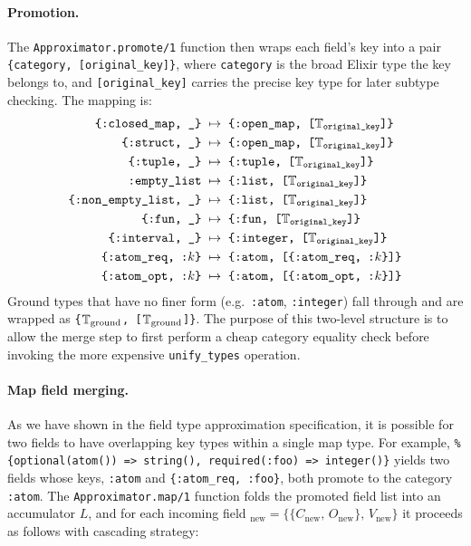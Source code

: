 \paragraph{Promotion.}
The \texttt{Approximator.promote/1} function then wraps each field's key into a pair \texttt{\{category, [original\_key]\}}, where \texttt{category} is the broad Elixir type the key belongs to, and \texttt{[original\_key]} carries the precise key type for later subtype checking.
The mapping is:
\begin{align*}
  \texttt{\{:closed\_map, \_\}} &\;\mapsto\; \texttt{\{:open\_map,  [$\mathbb{T}_{\text{original\_key}}$]\}} \\
  \texttt{\{:struct, \_\}}      &\;\mapsto\; \texttt{\{:open\_map,  [$\mathbb{T}_{\text{original\_key}}$]\}} \\
  \texttt{\{:tuple, \_\}}       &\;\mapsto\; \texttt{\{:tuple,     [$\mathbb{T}_{\text{original\_key}}$]\}} \\
  \texttt{:empty\_list}         &\;\mapsto\; \texttt{\{:list,      [$\mathbb{T}_{\text{original\_key}}$]\}} \\
  \texttt{\{:non\_empty\_list, \_\}} &\;\mapsto\; \texttt{\{:list, [$\mathbb{T}_{\text{original\_key}}$]\}} \\
  \texttt{\{:fun, \_\}}         &\;\mapsto\; \texttt{\{:fun,   [$\mathbb{T}_{\text{original\_key}}$]\}} \\      
  \texttt{\{:interval, \_\}}    &\;\mapsto\; \texttt{\{:integer,   [$\mathbb{T}_{\text{original\_key}}$]\}} \\
  \texttt{\{:atom\_req, :$k$\}}    &\;\mapsto\; \texttt{\{:atom,      [\{:atom\_req, :$k$\}]\}} \\
  \texttt{\{:atom\_opt, :$k$\}}    &\;\mapsto\; \texttt{\{:atom,      [\{:atom\_opt, :$k$\}]\}}
\end{align*}
Ground types that have no finer form (e.g.\ \texttt{:atom}, \texttt{:integer}) fall through and are wrapped as \texttt{\{$\mathbb{T}_{\text{ground}}$, [$\mathbb{T}_{\text{ground}}$]\}}.
The purpose of this two-level structure is to allow the merge step to first perform a cheap category equality check before invoking the more expensive \texttt{unify\_types} operation.

\paragraph{Map field merging.}
As we have shown in the field type approximation specification, it is possible for two fields to have overlapping key types within a single map type.
For example, \texttt{\%\{optional(atom()) => string(), required(:foo) => integer()\}} yields two fields whose keys, \texttt{:atom} and \texttt{\{:atom\_req, :foo\}}, both promote to the category \texttt{:atom}.
The \texttt{Approximator.map/1} function folds the promoted field list into an accumulator $L$, and for each incoming field \ETF$_\text{new} = \{\{C_\text{new},\, O_\text{new}\},\, V_\text{new}\}$ it proceeds as follows with cascading strategy:

